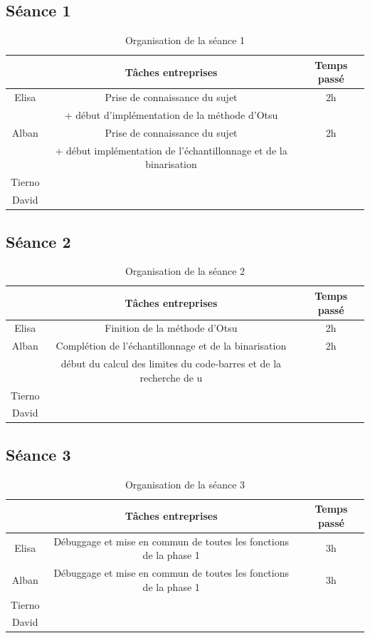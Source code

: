 \documentclass{rapport}
\begin{document}
\subsection{Séance 1}

\begin{table}[H]
	\centering 
	\begin{tabular}{c|c|c}
		& Tâches entreprises& Temps passé\\ \hline
		Elisa& Prise de connaissance du sujet & 2h\\
        & + début d'implémentation de la méthode d'Otsu & \\ \hline
		Alban& Prise de connaissance du sujet & 2h\\
        & + début implémentation de l'échantillonnage et de la binarisation & \\ \hline
		Tierno& & \\ \hline
		David& & 
	\end{tabular}
	\caption{Organisation de la séance 1}
\end{table}

\subsection{Séance 2}

\begin{table}[H]
	\centering 
	\begin{tabular}{c|c|c}
		& Tâches entreprises& Temps passé\\ \hline
		Elisa& Finition de la méthode d'Otsu & 2h\\ \hline
		Alban& Complétion de l'échantillonnage et de la binarisation& 2h\\
        &  début du calcul des limites du code-barres et de la recherche de u & \\ \hline
		Tierno& & \\ \hline
		David& & 
	\end{tabular}
	\caption{Organisation de la séance 2}
\end{table}

\subsection{Séance 3}

\begin{table}[H]
	\centering 
	\begin{tabular}{c|c|c}
		& Tâches entreprises& Temps passé\\ \hline
		Elisa& Débuggage et mise en commun de toutes les fonctions de la phase 1 & 3h\\ \hline
		Alban& Débuggage et mise en commun de toutes les fonctions de la phase 1& 3h\\ \hline
		Tierno& & \\ \hline
		David& & 
	\end{tabular}
	\caption{Organisation de la séance 3}
\end{table}
\end{document}
